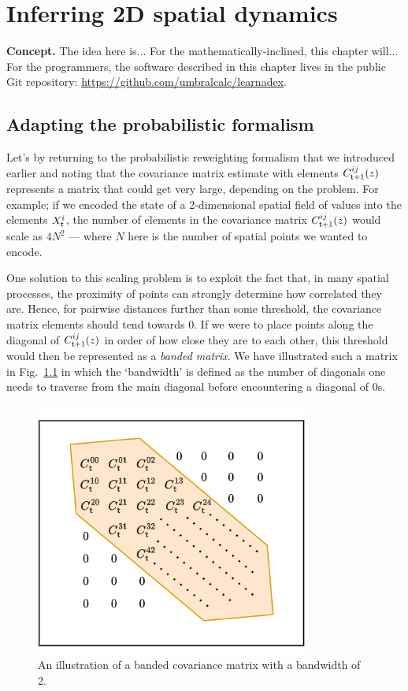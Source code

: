\chapter{\sffamily Inferring 2D spatial dynamics}

{\bfseries\sffamily Concept.} The idea here is... For the mathematically-inclined, this chapter will... For the programmers, the software described in this chapter lives in the public Git repository: \href{https://github.com/umbralcalc/learnadex}{https://github.com/umbralcalc/learnadex}.


\section{\sffamily Adapting the probabilistic formalism}

Let's by returning to the probabilistic reweighting formalism that we introduced earlier and noting that the covariance matrix estimate with elements $C^{ij}_{{\sf t}+1}(z)$ represents a matrix that could get very large, depending on the problem. For example; if we encoded the state of a 2-dimensional spatial field of values into the elements $X^i_{\sf t}$, the number of elements in the covariance matrix $C^{ij}_{{\sf t}+1}(z)$ would scale as $4N^2$ --- where $N$ here is the number of spatial points we wanted to encode. 

One solution to this scaling problem is to exploit the fact that, in many spatial processes, the proximity of points can strongly determine how correlated they are. Hence, for pairwise distances further than some threshold, the covariance matrix elements should tend towards 0. If we were to place points along the diagonal of $C^{ij}_{{\sf t}+1}(z)$ in order of how close they are to each other, this threshold would then be represented as a \emph{banded matrix}. We have illustrated such a matrix in Fig.~\ref{fig:banded-matrix} in which the `bandwidth' is defined as the number of diagonals one needs to traverse from the main diagonal before encountering a diagonal of 0s.

\begin{figure}[h]
\centering
\includegraphics[width=9cm]{images/chapter-15-banded-matrix.drawio.png}
\caption{An illustration of a banded covariance matrix with a bandwidth of 2.}
\label{fig:banded-matrix}
\end{figure}

